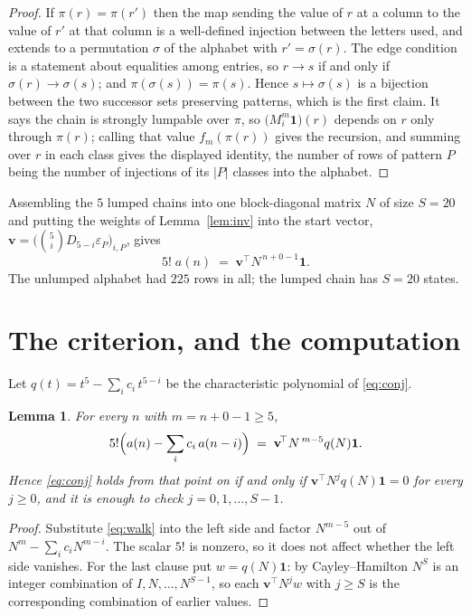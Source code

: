 \documentclass[11pt,a4paper]{article}
\theoremstyle{plain}
\newtheorem{lemma}[theorem]{Lemma}
\theoremstyle{definition}
\begin{document}
\begin{proof}
If $\pi(r)=\pi(r')$ then the map sending the value of $r$ at a column to the value of $r'$
at that column is a well-defined injection between the letters used, and extends to a
permutation $\sigma$ of the alphabet with $r'=\sigma(r)$. The edge condition is a statement
about equalities among entries, so $r\to s$ if and only if $\sigma(r)\to\sigma(s)$; and
$\pi(\sigma(s))=\pi(s)$. Hence $s\mapsto\sigma(s)$ is a bijection between the two successor
sets preserving patterns, which is the first claim. It says the chain is strongly lumpable
over $\pi$, so $\bigl(M_i^{m}\mathbf{1}\bigr)(r)$ depends on $r$ only through $\pi(r)$;
calling that value $f_m(\pi(r))$ gives the recursion, and summing over $r$ in each class
gives the displayed identity, the number of rows of pattern $P$ being the number of
injections of its $|P|$ classes into the alphabet.
\end{proof}

Assembling the $5$ lumped chains into one block-diagonal matrix $N$ of size $S=20$ and
putting the weights of Lemma~\ref{lem:inv} into the start vector,
$\mathbf{v}=\bigl(\binom{5}{i}D_{5-i}\varepsilon_P\bigr)_{i,P}$, gives
\begin{equation}\label{eq:walk}
5!\;a(n)\;=\;\mathbf{v}^{\!\top}N^{\,n+0-1}\mathbf{1} .
\end{equation}
The unlumped alphabet had $225$ rows in all; the lumped chain has $S=20$ states.

\section{The criterion, and the computation}

Let $q(t)=t^{5}-\sum_i c_i\,t^{5-i}$ be the characteristic polynomial of
\eqref{eq:conj}.

\begin{lemma}\label{lem:crit}
For every $n$ with $m=n+0-1\ge5$,
\[
5!\Bigl(a(n)-\sum_i c_i\,a(n-i)\Bigr)\;=\;\mathbf{v}^{\!\top}N^{\,m-5}q(N)\mathbf{1} .
\]
Hence \eqref{eq:conj} holds from that point on if and only if
$\mathbf{v}^{\!\top}N^{j}q(N)\mathbf{1}=0$ for every $j\ge0$, and it is enough to check
$j=0,1,\dots,S-1$.
\end{lemma}

\begin{proof}
Substitute \eqref{eq:walk} into the left side and factor $N^{m-5}$ out of
$N^{m}-\sum_i c_iN^{m-i}$. The scalar $5!$ is nonzero, so it does not affect whether
the left side vanishes. For the last clause put $w=q(N)\mathbf{1}$: by Cayley--Hamilton
$N^{S}$ is an integer combination of $I,N,\dots,N^{S-1}$, so each
$\mathbf{v}^{\!\top}N^{j}w$ with $j\ge S$ is the corresponding combination of earlier
values.
\end{proof}
\end{document}

